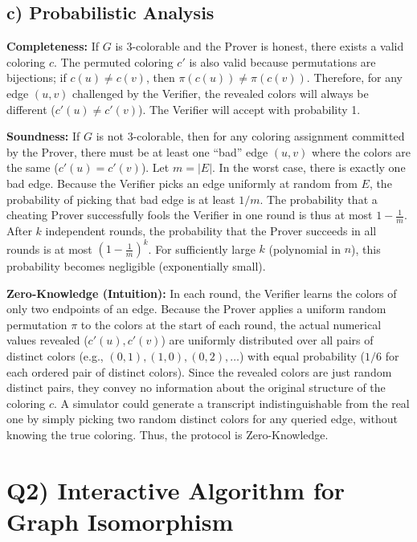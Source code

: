 \documentclass[11pt]{article}
\begin{document}
\subsection*{c) Probabilistic Analysis}

\textbf{Completeness:}
If $G$ is 3-colorable and the Prover is honest, there exists a valid coloring $c$. The permuted coloring $c'$ is also valid because permutations are bijections; if $c(u) \neq c(v)$, then $\pi(c(u)) \neq \pi(c(v))$. Therefore, for any edge $(u, v)$ challenged by the Verifier, the revealed colors will always be different ($c'(u) \neq c'(v)$). The Verifier will accept with probability 1.

\textbf{Soundness:}
If $G$ is not 3-colorable, then for any coloring assignment committed by the Prover, there must be at least one ``bad'' edge $(u, v)$ where the colors are the same ($c'(u) = c'(v)$). Let $m = |E|$. In the worst case, there is exactly one bad edge.
Because the Verifier picks an edge uniformly at random from $E$, the probability of picking that bad edge is at least $1/m$.
The probability that a cheating Prover successfully fools the Verifier in one round is thus at most $1 - \frac{1}{m}$.
After $k$ independent rounds, the probability that the Prover succeeds in all rounds is at most $(1 - \frac{1}{m})^k$. For sufficiently large $k$ (polynomial in $n$), this probability becomes negligible (exponentially small).

\textbf{Zero-Knowledge (Intuition):}
In each round, the Verifier learns the colors of only two endpoints of an edge. Because the Prover applies a uniform random permutation $\pi$ to the colors at the start of each round, the actual numerical values revealed ($c'(u), c'(v)$) are uniformly distributed over all pairs of distinct colors (e.g., $(0,1), (1,0), (0,2), \dots$) with equal probability ($1/6$ for each ordered pair of distinct colors).
Since the revealed colors are just random distinct pairs, they convey no information about the original structure of the coloring $c$. A simulator could generate a transcript indistinguishable from the real one by simply picking two random distinct colors for any queried edge, without knowing the true coloring. Thus, the protocol is Zero-Knowledge.

\newpage

\section*{Q2) Interactive Algorithm for Graph Isomorphism}
\end{document}
